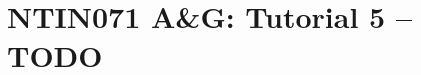 \documentclass[a4paper,12pt]{amsart}
\begin{document}

\section*{NTIN071 A\&G: Tutorial 5 -- TODO}


\medskip


\medskip
\end{document}
